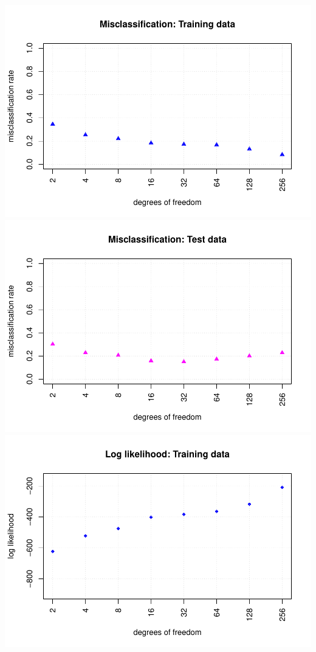 \documentclass[
]{article}
\begin{document}
\includegraphics{A2_files/figure-latex/unnamed-chunk-16-1.pdf}
\includegraphics{A2_files/figure-latex/unnamed-chunk-16-2.pdf}
\includegraphics{A2_files/figure-latex/unnamed-chunk-16-3.pdf}
\end{document}
